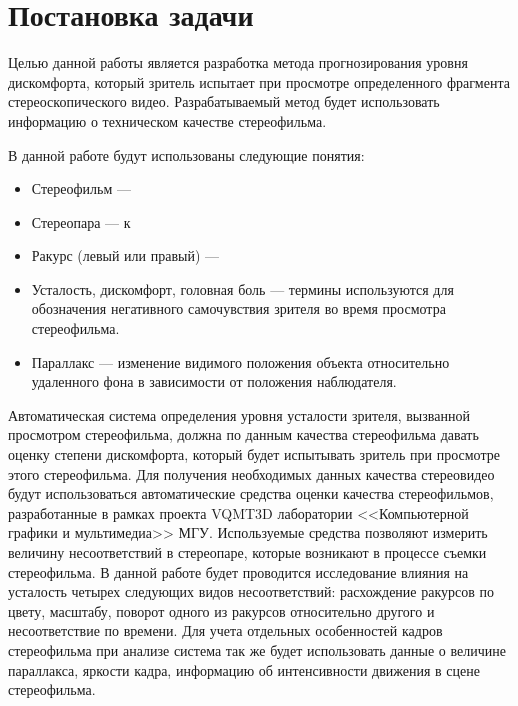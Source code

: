 \section{Постановка задачи}
Целью данной работы является разработка метода прогнозирования уровня дискомфорта, который зритель испытает при просмотре определенного фрагмента стереоскопического видео. Разрабатываемый метод будет использовать информацию о техническом качестве стереофильма.

В данной работе будут использованы следующие понятия:
\begin{itemize}
\item{Стереофильм — }
\item{Стереопара — к}
\item{Ракурс (левый или правый) — }
\item{Усталость, дискомфорт, головная боль — термины используются для обозначения негативного самочувствия зрителя во время просмотра стереофильма.}
\item{Параллакс — изменение видимого положения объекта относительно удаленного фона в зависимости от положения наблюдателя.}
\end{itemize}

Автоматическая система определения уровня усталости зрителя, вызванной просмотром стереофильма, должна по данным качества стереофильма давать оценку степени дискомфорта, который будет испытывать зритель при просмотре этого стереофильма. Для получения необходимых данных качества стереовидео будут использоваться автоматические средства оценки качества стереофильмов, разработанные в рамках проекта VQMT3D \cite{vqmt3d} лаборатории <<Компьютерной графики и мультимедиа>> МГУ. Используемые средства позволяют измерить величину несоответствий в стереопаре, которые возникают в процессе съемки стереофильма. В данной работе будет проводится исследование влияния на усталость четырех следующих видов несоответствий: расхождение ракурсов по цвету, масштабу, поворот одного из ракурсов относительно другого и несоответствие по времени. Для учета отдельных особенностей кадров стереофильма при анализе система так же будет использовать данные о величине параллакса, яркости кадра, информацию об интенсивности движения в сцене стереофильма. 